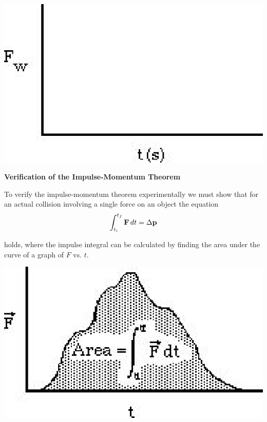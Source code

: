 \vspace{0.3cm}
{\par\centering \includegraphics{impulse/impulse_fig2.eps} \par}
\vspace{0.3cm}

\textbf{Verification of the Impulse-Momentum Theorem} 

To verify the impulse-momentum theorem experimentally we must show that for
an actual collision involving a single force on an object the equation
\[
\int_{t_{i}}^{t_{f}}{\bf F}\,dt=\Delta {\bf p}\]


holds, where the impulse integral can be calculated by finding the area under
the curve of a graph of $F$ vs. $t$.

\vspace{0.3cm}
{\par\centering \includegraphics{impulse/impulse_fig3.eps} \par}
\vspace{0.3cm}

